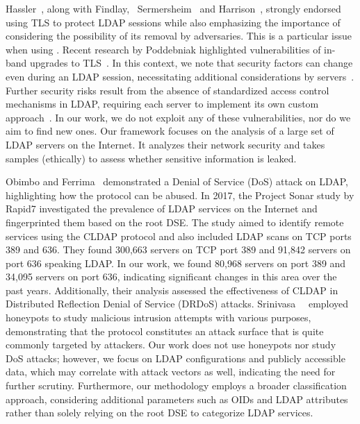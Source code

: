 Hassler~\cite{hassler500LDAPSecurity1999}, along with Findlay,~\cite{findlayBestPracticesLDAP} Sermersheim~\cite{rfc4511} and Harrison~\cite{RFC4512LDAPAuthenticationMethodsAndSecurityMechanisms}, strongly endorsed using \acrshort{TLS} to protect \acrshort{LDAP} sessions while also emphasizing the importance of considering the possibility of its removal by adversaries. This is a particular issue when using \starttls. Recent research by Poddebniak \etal highlighted vulnerabilities of in-band upgrades to \acrshort{TLS}~\cite{poddebniak2021}. In this context, we note that security factors can change even during an \acrshort{LDAP} session, necessitating additional considerations by servers~\cite{rfc4511, RFC4512LDAPAuthenticationMethodsAndSecurityMechanisms, findlayBestPracticesLDAP}. Further security risks result from the absence of standardized access control mechanisms in \acrshort{LDAP}, requiring each server to implement its own custom approach~\cite{hassler500LDAPSecurity1999, findlayBestPracticesLDAP}. In our work, we do not exploit any of these vulnerabilities, nor do we aim to find new ones. Our framework focuses on the analysis of a large set of \gls{LDAP} servers on the Internet. It analyzes their network security and takes samples (ethically) to assess whether sensitive information is leaked.

Obimbo and Ferrima~\cite{obimboVulnerabilitiesLDAPAuthentication2011} demonstrated a Denial of Service (DoS) attack on LDAP, highlighting how the protocol can be abused. In 2017, the Project Sonar study by Rapid7 \cite{project_sonar_rapid7} investigated the prevalence of LDAP services on the Internet and fingerprinted them based on the root \gls{DSE}. The study aimed to identify remote services using the \gls{CLDAP} protocol and also included LDAP scans on TCP ports 389 and 636. They found 300,663 servers on TCP port 389 and 91,842 servers on port 636 speaking LDAP. In our work, we found 80,968 servers on port 389 and 34,095 servers on port 636, indicating significant changes in this area over the past years. Additionally, their analysis assessed the effectiveness of \gls{CLDAP} in Distributed Reflection Denial of Service (DRDoS) attacks. Srinivasa~\etal~\cite{srinivasa2022} employed honeypots to study malicious intrusion attempts with various purposes, demonstrating that the protocol constitutes an attack surface that is quite commonly targeted by attackers. Our work does not use honeypots nor study DoS attacks; however, we focus on LDAP configurations and publicly accessible data, which may correlate with attack vectors as well, indicating the need for further scrutiny. Furthermore, our methodology employs a broader classification approach, considering additional parameters such as OIDs and LDAP attributes rather than solely relying on the root \gls{DSE} to categorize LDAP services.

